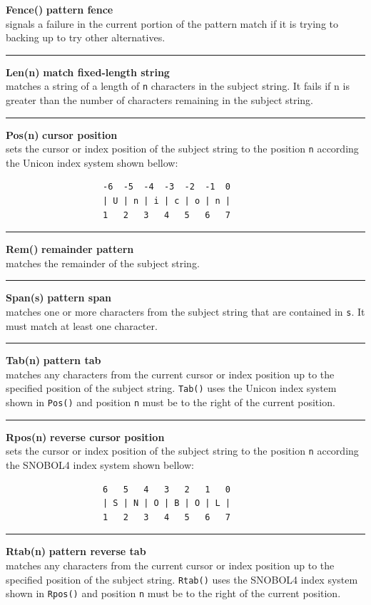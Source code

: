 \documentclass{article}
\begin{document}
\noindent\textbf{Fence()} \hfill\textbf{pattern fence}\\
signals a failure in the current portion of the pattern match if it is trying to backing up to try other alternatives.\\
\noindent\rule{15cm}{0.1pt}

\noindent\textbf{Len(n)} \hfill\textbf{match fixed-length string}\\
matches a string of a length of \texttt{n} characters in the subject string.  It fails if n is greater than the number of characters remaining in the subject string.\\
\noindent\rule{15cm}{0.1pt}

\noindent\textbf{Pos(n)} \hfill\textbf{cursor position}\\
sets the cursor or index position of the subject string to the position \texttt{n} according the Unicon index system shown bellow:
\begin{verbatim}
                   -6  -5  -4  -3  -2  -1  0
                   | U | n | i | c | o | n |
                   1   2   3   4   5   6   7
\end{verbatim}
\noindent\rule{15cm}{0.1pt}

\noindent\textbf{Rem()} \hfill\textbf{remainder pattern}\\
matches the remainder of the subject string.\\
\noindent\rule{15cm}{0.1pt}

\noindent\textbf{Span(s)} \hfill\textbf{pattern span}\\
matches one or more characters from the subject string that are contained in \texttt{s}.  It must match at least one character.\\
\noindent\rule{15cm}{0.1pt}

\noindent\textbf{Tab(n)} \hfill\textbf{pattern tab}\\
matches any characters from the current cursor or index position up to the specified position of the subject string.  \texttt{Tab()} uses the Unicon index system shown in \texttt{Pos()} and position \texttt{n} must be to the right of the current position.\\
\noindent\rule{15cm}{0.1pt}

\noindent\textbf{Rpos(n)} \hfill\textbf{reverse cursor position}\\
sets the cursor or index position of the subject string to the position \texttt{n} according the SNOBOL4 index system shown bellow:
\begin{verbatim}
                   6   5   4   3   2   1   0
                   | S | N | O | B | O | L |
                   1   2   3   4   5   6   7
\end{verbatim}
\noindent\rule{15cm}{0.1pt}

\noindent\textbf{Rtab(n)} \hfill\textbf{pattern reverse tab}\\
matches any characters from the current cursor or index position up to the specified position of the subject string.  \texttt{Rtab()} uses the SNOBOL4 index system shown in \texttt{Rpos()} and position \texttt{n} must be to the right of the current position.\\
\end{document}
